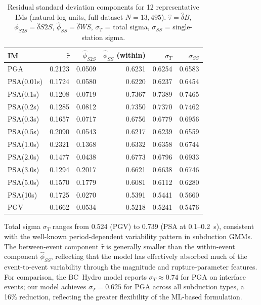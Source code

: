 \documentclass[12pt,a4paper]{article}
\begin{document}
\begin{table}[htbp]
\centering
\caption{Residual standard deviation components for 12 representative IMs
(natural-log units, full dataset $N = 13{,}495$).
$\hat{\tau} = \hat{\delta}B$, $\phi_{S2S} = \hat{\delta}S2S$,
$\hat{\phi}_{SS} = \hat{\delta}WS$, $\sigma_T$ = total sigma,
$\sigma_{SS}$ = single-station sigma.}
\label{tab:sigma}
\footnotesize
\renewcommand{\arraystretch}{1.18}
\begin{tabular}{lrrrrr}
\toprule
IM & $\hat{\tau}$ & $\hat{\phi}_{S2S}$ & $\hat{\phi}_{SS}$ (within) & $\sigma_T$ & $\sigma_{SS}$ \\
\midrule
PGA         & 0.2123 & 0.0509 & 0.6231 & 0.6254 & 0.6583 \\
PSA(0.01s)  & 0.1724 & 0.0580 & 0.6220 & 0.6237 & 0.6454 \\
PSA(0.1s)   & 0.1208 & 0.0719 & 0.7367 & 0.7389 & 0.7465 \\
PSA(0.2s)   & 0.1285 & 0.0812 & 0.7350 & 0.7370 & 0.7462 \\
PSA(0.3s)   & 0.1657 & 0.0717 & 0.6756 & 0.6779 & 0.6956 \\
PSA(0.5s)   & 0.2090 & 0.0543 & 0.6217 & 0.6239 & 0.6559 \\
PSA(1.0s)   & 0.2321 & 0.1368 & 0.6332 & 0.6358 & 0.6744 \\
PSA(2.0s)   & 0.1477 & 0.0438 & 0.6773 & 0.6796 & 0.6933 \\
PSA(3.0s)   & 0.1294 & 0.2017 & 0.6621 & 0.6638 & 0.6746 \\
PSA(5.0s)   & 0.1570 & 0.1779 & 0.6081 & 0.6112 & 0.6280 \\
PSA(10s)    & 0.1725 & 0.0270 & 0.5391 & 0.5441 & 0.5660 \\
PGV         & 0.1662 & 0.0534 & 0.5218 & 0.5241 & 0.5476 \\
\bottomrule
\end{tabular}
\end{table}

Total sigma $\sigma_T$ ranges from 0.524 (PGV) to 0.739 (PSA at 0.1--0.2~s),
consistent with the well-known period-dependent variability pattern in
subduction GMMs.
The between-event component $\hat{\tau}$ is generally smaller than the
within-event component $\hat{\phi}_{SS}$, reflecting that the model has
effectively absorbed much of the event-to-event variability through the
magnitude and rupture-parameter features.
For comparison, the BC~Hydro model \citep{Abrahamson2016} reports
$\sigma_T \approx 0.74$ for PGA on interface events; our model achieves
$\sigma_T = 0.625$ for PGA across all subduction types, a 16\% reduction,
reflecting the greater flexibility of the ML-based formulation.
\end{document}
